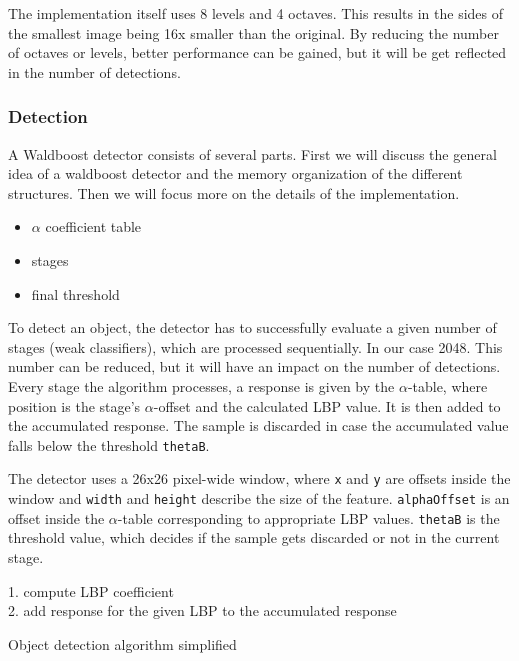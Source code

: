 The implementation itself uses 8 levels and 4 octaves. This results in the sides of the smallest image being 16x smaller than the original. By reducing the number of octaves or levels, better performance can be gained, but it will be get reflected in the number of detections.

\subsubsection{Detection}

A Waldboost detector consists of several parts. First we will discuss the general idea of a waldboost detector and the memory organization of the different structures. Then we will focus more on the details of the implementation.

\begin{itemize}
	\item $\alpha$ coefficient table
	\item stages
	\item final threshold
\end{itemize}

To detect an object, the detector has to successfully evaluate a given number of stages (weak classifiers), which are processed sequentially. In our case 2048. This number can be reduced, but it will have an impact on the number of detections. Every stage the algorithm processes, a response is given by the $\alpha$-table, where position is the stage's $\alpha$-offset and the calculated LBP value. It is then added to the accumulated response. The sample is discarded in case the accumulated value falls below the threshold \verb|thetaB|.



The detector uses a 26x26 pixel-wide window, where \verb|x| and \verb|y| are offsets inside the window and \verb|width| and \verb|height| describe the size of the feature. \verb|alphaOffset| is an offset inside the $\alpha$-table corresponding to appropriate LBP values. \verb|thetaB| is the threshold value, which decides if the sample gets discarded or not in the current stage.

\begin{algorithm} \label{alg:detection}
{
	{
		1. compute LBP coefficient \\
		2. add response for the given LBP to the accumulated response \\
	}
}

\caption{Object detection algorithm simplified}
\end{algorithm}

